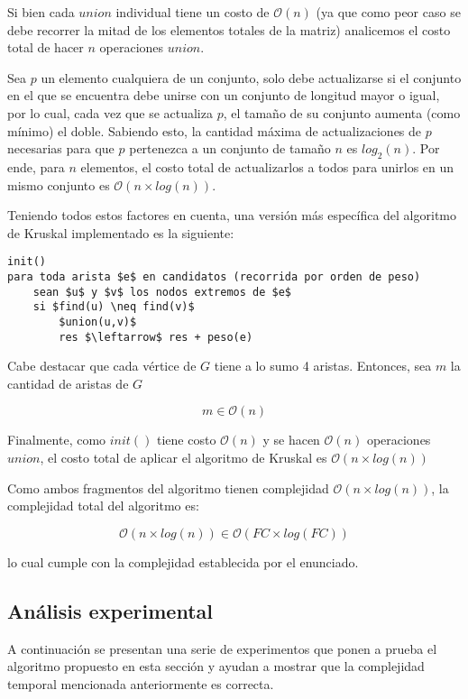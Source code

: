 Si bien cada $union$ individual tiene un costo de $\mathcal{O}(n)$ (ya que como peor caso se debe recorrer la mitad de los elementos totales de la matriz) analicemos el costo total de hacer $n$ operaciones $union$.

Sea $p$ un elemento cualquiera de un conjunto, solo debe actualizarse si el conjunto en el que se encuentra debe unirse con un conjunto de longitud mayor o igual, por lo cual, cada vez que se actualiza $p$, el tamaño de su conjunto aumenta (como mínimo) el doble. Sabiendo esto, la cantidad máxima de actualizaciones de $p$ necesarias para que $p$ pertenezca a un conjunto de tamaño $n$ es $log_2(n)$. Por ende, para $n$ elementos, el costo total de actualizarlos a todos para unirlos en un mismo conjunto es $\mathcal{O}(n \times log(n))$.

Teniendo todos estos factores en cuenta, una versión más específica del algoritmo de Kruskal implementado es la siguiente:

\begin{lstlisting}
init()
para toda arista $e$ en candidatos (recorrida por orden de peso)
	sean $u$ y $v$ los nodos extremos de $e$
	si $find(u) \neq find(v)$
		$union(u,v)$
		res $\leftarrow$ res + peso(e)
\end{lstlisting}

Cabe destacar que cada vértice de $G$ tiene a lo sumo 4 aristas. Entonces, sea $m$ la cantidad de aristas de $G$

$$m \in \mathcal{O}(n)$$

Finalmente, como $init()$ tiene costo $\mathcal{O}(n)$ y se hacen $\mathcal{O}(n)$ operaciones $union$, el costo total de aplicar el algoritmo de Kruskal es $\mathcal{O}(n \times log(n))$

Como ambos fragmentos del algoritmo tienen complejidad $\mathcal{O}(n \times log(n))$, la complejidad total del algoritmo es:

$$\mathcal{O}(n \times log(n)) \in \mathcal{O}(FC \times log(FC))$$

lo cual cumple con la complejidad establecida por el enunciado. \QEDB

\subsection{Análisis experimental}

A continuación se presentan una serie de experimentos que ponen a prueba el algoritmo propuesto en esta sección y ayudan a mostrar que la complejidad temporal mencionada anteriormente es correcta.

